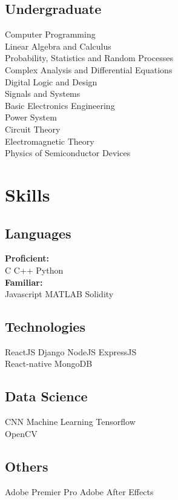 \documentclass[]{deedy-resume-openfont}
\begin{document}
\begin{minipage}[t]{0.35\textwidth}
\subsection{Undergraduate}
Computer Programming \\
Linear Algebra and Calculus \\
Probability, Statistics and Random Processes \\
Complex Analysis and Differential Equations \\
Digital Logic and Design \\
Signals and Systems \\
Basic Electronics Engineering \\
Power System \\
Circuit Theory\\
Electromagnetic Theory\\
Physics of Semiconductor Devices \\


\section{Skills}
\subsection{Languages}
\textbf{Proficient:}
\\\textbullet{} C \textbullet{}C++ \textbullet{} Python
\\\textbf{Familiar:}
\\\textbullet{} Javascript  \textbullet{} MATLAB \textbullet{} Solidity
\sectionsep
\subsection{Technologies}
\textbullet{} ReactJS  \textbullet{} Django \textbullet{} NodeJS \textbullet{} ExpressJS  \\ \textbullet{} React-native \textbullet{} MongoDB
\sectionsep
\subsection{Data Science}
\textbullet{} CNN
\textbullet{} Machine Learning 
\textbullet{} Tensorflow \\
\textbullet{} OpenCV
\sectionsep
\subsection{Others}
\textbullet{} Adobe Premier Pro  
\textbullet{} Adobe After Effects


\end{minipage}
\end{document}
